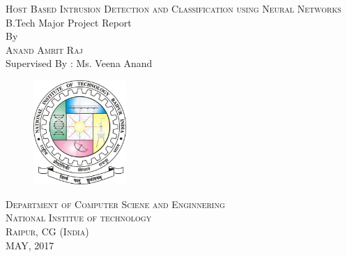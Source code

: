 \documentclass[12pt]{article}
\newcommand{\projectTitle}{Host Based Intrusion Detection and Classification using Neural Networks}
\theoremstyle{definition}
\begin{document}
	\begin{titlepage}
		\vspace*{\fill}
		\begin{center}
			\textsc{\Large \projectTitle}\\
			[0.5in]
			B.Tech Major Project Report\\
			[2in]
			By\\
			[.5in]
			\textsc{Anand Amrit Raj}\\
			Supervised By : Ms. Veena Anand\\
			[.5in]
			\begin{figure}[!h]
				\centering
				\includegraphics[width=100pt]{pictures/nitrr-logo.jpg}
			\end{figure}
			\vspace{.25in}
			\textsc{Department of Computer Sciene and Enginnering}\\
			\textsc{National Institue of technology}\\
			\textsc{Raipur, CG (India)}\\
			MAY, 2017
		\end{center}
	 	\vspace*{\fill}
	\end{titlepage}
	
\end{document}
